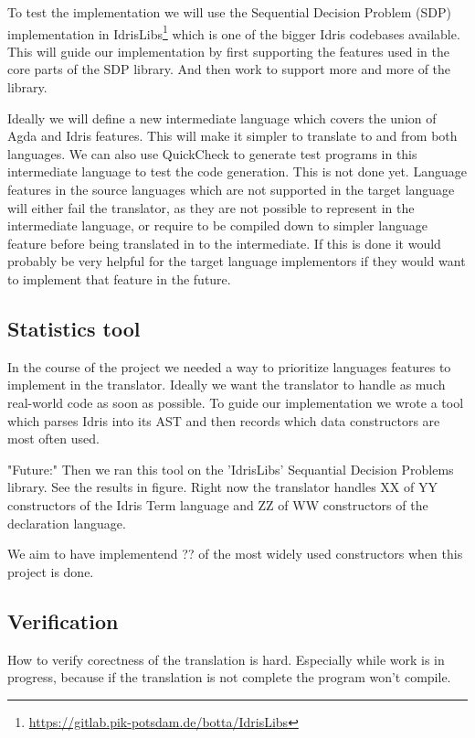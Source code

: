\documentclass[parskip=half]{scrartcl}
\begin{document}
To test the implementation we will use the Sequential Decision Problem (SDP)
implementation in
IdrisLibs\footnote{\url{https://gitlab.pik-potsdam.de/botta/IdrisLibs}} which
is one of the bigger Idris codebases available. This will guide our
implementation by first supporting the features used in the core parts of the
SDP library. And then work to support more and more of the library.


Ideally we will define a new intermediate language which covers the union of
Agda and Idris features. This will make it simpler to translate to and from
both languages. We can also use QuickCheck to generate test programs in this
intermediate language to test the code generation. This is not done yet.
Language features in the source languages which are not supported in the target
language will either fail the translator, as they are not possible to represent
in the intermediate language, or require to be compiled down to simpler
language feature before being translated in to the intermediate. If this is
done it would probably be very helpful for the target language implementors if
they would want to implement that feature in the future.



\subsection{Statistics tool}
In the course of the project we needed a way to prioritize languages features
to implement in the translator. Ideally we want the translator to handle
as much real-world code as soon as possible. To guide our implementation we
wrote a tool which parses Idris into its AST and then records which data
constructors are most often used.

"Future:" Then we ran this tool on the 'IdrisLibs' Sequantial Decision
Problems library. See the results in figure. Right now the translator handles
XX of YY constructors of the Idris Term language and ZZ of WW constructors of
the declaration language.

We aim to have implementend ?? of the most widely used constructors when this
project is done.


\subsection{Verification}
How to verify corectness of the translation is hard. Especially while work is
in progress, because if the translation is not complete the program won't
compile.
\end{document}
